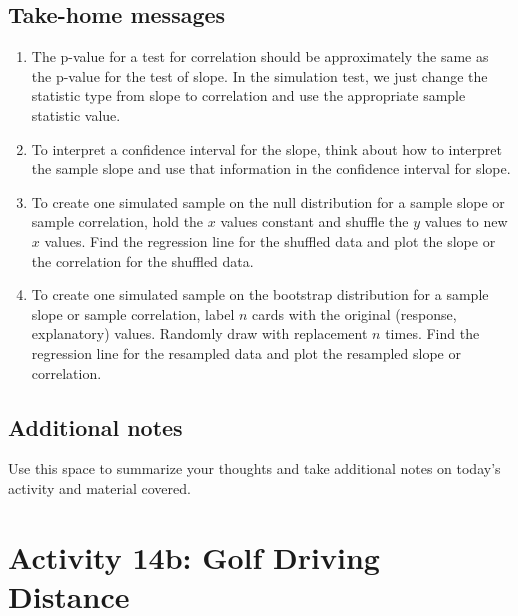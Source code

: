\documentclass[
]{report}
\begin{document}
\vspace{.6in}

\hypertarget{take-home-messages-18}{%
\subsection{Take-home messages}\label{take-home-messages-18}}

\begin{enumerate}
\def\labelenumi{\arabic{enumi}.}
\item
  The p-value for a test for correlation should be approximately the same as the p-value for the test of slope. In the simulation test, we just change the statistic type from slope to correlation and use the appropriate sample statistic value.
\item
  To interpret a confidence interval for the slope, think about how to interpret the sample slope and use that information in the confidence interval for slope.
\item
  To create one simulated sample on the null distribution for a sample slope or sample correlation, hold the \(x\) values constant and shuffle the \(y\) values to new \(x\) values. Find the regression line for the shuffled data and plot the slope or the correlation for the shuffled data.
\item
  To create one simulated sample on the bootstrap distribution for a sample slope or sample correlation, label \(n\) cards with the original (response, explanatory) values. Randomly draw with replacement \(n\) times. Find the regression line for the resampled data and plot the resampled slope or correlation.
\end{enumerate}

\newpage

\hypertarget{additional-notes-18}{%
\subsection{Additional notes}\label{additional-notes-18}}

Use this space to summarize your thoughts and take additional notes on today's activity and material covered.

\newpage

\hypertarget{activity-14b-golf-driving-distance}{%
\section{Activity 14b: Golf Driving Distance}\label{activity-14b-golf-driving-distance}}
\end{document}
